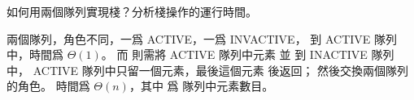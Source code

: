 \startEXERCISE
如何用兩個隊列實現棧？分析棧操作的運行時間。
\stopEXERCISE

\startANSWER
兩個隊列，角色不同，一爲 ACTIVE，一爲 INVACTIVE，
  到 ACTIVE 隊列中，時間爲 $\Theta(1)$。
而  則需將 ACTIVE 隊列中元素  並  到 INACTIVE 隊列中，
 ACTIVE 隊列中只留一個元素，最後這個元素  後返回；
然後交換兩個隊列的角色。
  時間爲 $\Theta(n)$，其中  爲 隊列中元素數目。
\stopANSWER
